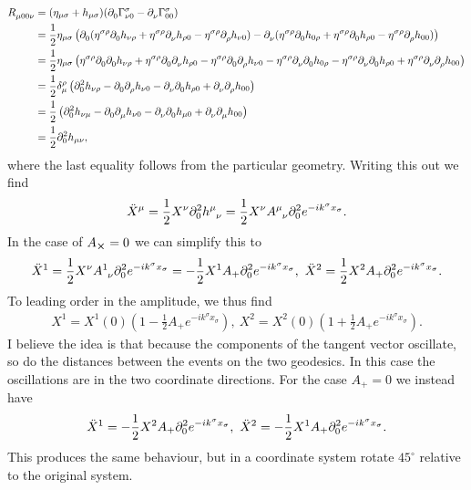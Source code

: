 \begin{align*}
	\tensor{R}{_{\mu 00\nu}} &= (\eta_{\mu\sigma} + h_{\mu\sigma})(\del{0}{\chris{\sigma}{\nu}{0}} - \del{\nu}{\chris{\sigma}{0}{0}}) \\
	                         &= \frac{1}{2}\eta_{\mu\sigma}\left(\del{0}{(\eta^{\sigma\rho}\del{0}{h_{\nu\rho}} + \eta^{\sigma\rho}\del{\nu}{h_{\rho 0}} - \eta^{\sigma\rho}\del{\rho}{h_{\nu 0}})} - \del{\nu}{(\eta^{\sigma\rho}\del{0}{h_{0\rho}} + \eta^{\sigma\rho}\del{0}{h_{\rho 0}} - \eta^{\sigma\rho}\del{\rho}{h_{00}})}\right) \\
	                         &= \frac{1}{2}\eta_{\mu\sigma}\left(\eta^{\sigma\rho}\del{0}{\del{0}{h_{\nu\rho}}} + \eta^{\sigma\rho}\del{0}{\del{\nu}{h_{\rho 0}}} - \eta^{\sigma\rho}\del{0}{\del{\rho}{h_{\nu 0}}} - \eta^{\sigma\rho}\del{\nu}{\del{0}{h_{0\rho}}} - \eta^{\sigma\rho}\del{\nu}{\del{0}{h_{\rho 0}}} + \eta^{\sigma\rho}\del{\nu}{\del{\rho}{h_{00}}}\right) \\
	                         &= \frac{1}{2}\kdelta{\rho}{\mu}\left(\del[2]{0}{h_{\nu\rho}} - \del{0}{\del{\rho}{h_{\nu 0}}} - \del{\nu}{\del{0}{h_{\rho 0}}} + \del{\nu}{\del{\rho}{h_{00}}}\right) \\
	                         &= \frac{1}{2}\left(\del[2]{0}{h_{\nu\mu}} - \del{0}{\del{\mu}{h_{\nu 0}}} - \del{\nu}{\del{0}{h_{\mu 0}}} + \del{\nu}{\del{\mu}{h_{00}}}\right) \\
	                         &= \frac{1}{2}\del[2]{0}{h_{\mu\nu}},
\end{align*}
where the last equality follows from the particular geometry. Writing this out we find
\begin{align*}
	\ddot{X}^{\mu} = \frac{1}{2}X^{\nu}\del[2]{0}{\tensor{h}{^{\mu}_{\nu}}} = \frac{1}{2}X^{\nu}\tensor{A}{^{\mu}_{\nu}}\del[2]{0}{e^{-ik^{\sigma}x_{\sigma}}}.
\end{align*}
In the case of $A_{\cross} = 0$ we can simplify this to
\begin{align*}
	\ddot{X}^{1} = \frac{1}{2}X^{\nu}\tensor{A}{^{1}_{\nu}}\del[2]{0}{e^{-ik^{\sigma}x_{\sigma}}} = -\frac{1}{2}X^{1}A_{+}\del[2]{0}{e^{-ik^{\sigma}x_{\sigma}}},\ \ddot{X}^{2} =  \frac{1}{2}X^{2}A_{+}\del[2]{0}{e^{-ik^{\sigma}x_{\sigma}}}.
\end{align*}
To leading order in the amplitude, we thus find
\begin{align*}
	X^{1} = X^{1}(0)\left(1 - \frac{1}{2}A_{+}e^{-ik^{\sigma}x_{\sigma}}\right),\ X^{2} = X^{2}(0)\left(1 + \frac{1}{2}A_{+}e^{-ik^{\sigma}x_{\sigma}}\right).
\end{align*}
I believe the idea is that because the components of the tangent vector oscillate, so do the distances between the events on the two geodesics. In this case the oscillations are in the two coordinate directions. For the case $A_{+} = 0$ we instead have
\begin{align*}
	\ddot{X}^{1} = -\frac{1}{2}X^{2}A_{+}\del[2]{0}{e^{-ik^{\sigma}x_{\sigma}}},\ \ddot{X}^{2} = -\frac{1}{2}X^{1}A_{+}\del[2]{0}{e^{-ik^{\sigma}x_{\sigma}}}.
\end{align*}
This produces the same behaviour, but in a coordinate system rotate $45^{\circ}$ relative to the original system.

